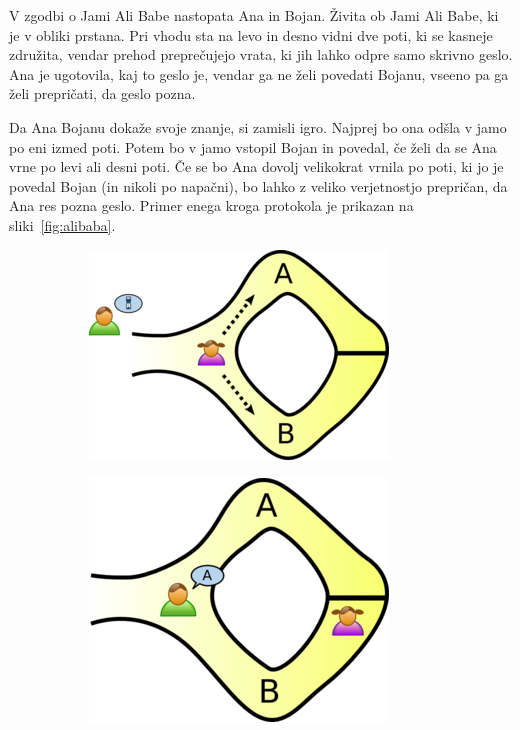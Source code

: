 \documentclass[isrm2, tisk]{fmfdelo}
\begin{document}
\begin{primer}
    V zgodbi o Jami Ali Babe nastopata Ana in Bojan. Živita ob Jami Ali Babe, ki je v obliki prstana. 
    Pri vhodu sta na levo in desno vidni dve poti, ki se kasneje združita, vendar prehod preprečujejo 
    vrata, ki jih lahko odpre samo skrivno geslo. Ana je ugotovila, kaj to geslo je, vendar ga ne želi 
    povedati Bojanu, vseeno pa ga želi prepričati, da geslo pozna. 

    Da Ana Bojanu dokaže svoje znanje, si zamisli igro. Najprej bo ona odšla v jamo po eni izmed poti. 
    Potem bo v jamo vstopil Bojan in povedal, če želi da se Ana vrne po levi ali desni poti. Če se 
    bo Ana dovolj velikokrat vrnila po poti, ki jo je povedal Bojan (in nikoli po napačni), bo lahko 
    z veliko verjetnostjo prepričan, da Ana res pozna geslo. Primer enega kroga protokola je prikazan 
    na sliki~\ref{fig:alibaba}. 
    \begin{figure}[ht]
      \centering
        \begin{subfigure}{0.28\textwidth}
            \includegraphics[width=\textwidth]{images/zkp1.png}
        \end{subfigure}
        \hspace{0.25cm}
        \begin{subfigure}{0.25\textwidth}
            \includegraphics[width=\textwidth]{images/zkp2.png}

\end{subfigure}
\end{figure}
\end{primer}
\end{document}
